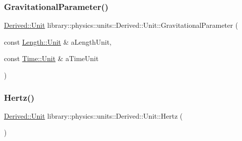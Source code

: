\subsubsection{\texorpdfstring{Gravitational\+Parameter()}{GravitationalParameter()}}
{\footnotesize\ttfamily \hyperlink{classlibrary_1_1physics_1_1units_1_1_derived_1_1_unit}{Derived\+::\+Unit} library\+::physics\+::units\+::\+Derived\+::\+Unit\+::\+Gravitational\+Parameter (\begin{DoxyParamCaption}\item[{const \hyperlink{classlibrary_1_1physics_1_1units_1_1_length_a3b8b39cd245cf6b19dc34459baeccb18}{Length\+::\+Unit} \&}]{a\+Length\+Unit,  }\item[{const \hyperlink{classlibrary_1_1physics_1_1units_1_1_time_ab876a6a05c9a2f28905f2753bfd64109}{Time\+::\+Unit} \&}]{a\+Time\+Unit }\end{DoxyParamCaption})\hspace{0.3cm}{\ttfamily [static]}}

\mbox{\label{classlibrary_1_1physics_1_1units_1_1_derived_1_1_unit_a3eb18a6cc5208068ea633533edddf0d3}} 
\subsubsection{\texorpdfstring{Hertz()}{Hertz()}}
{\footnotesize\ttfamily \hyperlink{classlibrary_1_1physics_1_1units_1_1_derived_1_1_unit}{Derived\+::\+Unit} library\+::physics\+::units\+::\+Derived\+::\+Unit\+::\+Hertz (\begin{DoxyParamCaption}{ }\end{DoxyParamCaption})\hspace{0.3cm}{\ttfamily [static]}}

\mbox{\label{classlibrary_1_1physics_1_1units_1_1_derived_1_1_unit_a44a173b22d6c9c26bfbbc4291cd00cc8}} 
